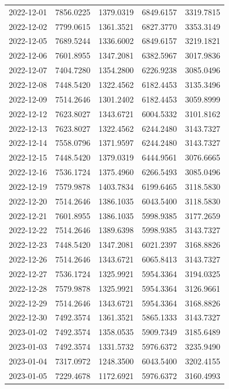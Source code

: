 {\begin{longtable}{lllll}
2022-12-01 & 7856.0225 & 1379.0319 & 6849.6157 & 3319.7815 \\
2022-12-02 & 7799.0615 & 1361.3521 & 6827.3770 & 3353.3149 \\
2022-12-05 & 7689.5244 & 1336.6002 & 6849.6157 & 3219.1821 \\
2022-12-06 & 7601.8955 & 1347.2081 & 6382.5967 & 3017.9836 \\
2022-12-07 & 7404.7280 & 1354.2800 & 6226.9238 & 3085.0496 \\
2022-12-08 & 7448.5420 & 1322.4562 & 6182.4453 & 3135.3496 \\
2022-12-09 & 7514.2646 & 1301.2402 & 6182.4453 & 3059.8999 \\
2022-12-12 & 7623.8027 & 1343.6721 & 6004.5332 & 3101.8162 \\
2022-12-13 & 7623.8027 & 1322.4562 & 6244.2480 & 3143.7327 \\
2022-12-14 & 7558.0796 & 1371.9597 & 6244.2480 & 3143.7327 \\
2022-12-15 & 7448.5420 & 1379.0319 & 6444.9561 & 3076.6665 \\
2022-12-16 & 7536.1724 & 1375.4960 & 6266.5493 & 3085.0496 \\
2022-12-19 & 7579.9878 & 1403.7834 & 6199.6465 & 3118.5830 \\
2022-12-20 & 7514.2646 & 1386.1035 & 6043.5400 & 3118.5830 \\
2022-12-21 & 7601.8955 & 1386.1035 & 5998.9385 & 3177.2659 \\
2022-12-22 & 7514.2646 & 1389.6398 & 5998.9385 & 3143.7327 \\
2022-12-23 & 7448.5420 & 1347.2081 & 6021.2397 & 3168.8826 \\
2022-12-26 & 7514.2646 & 1343.6721 & 6065.8413 & 3143.7327 \\
2022-12-27 & 7536.1724 & 1325.9921 & 5954.3364 & 3194.0325 \\
2022-12-28 & 7579.9878 & 1325.9921 & 5954.3364 & 3126.9661 \\
2022-12-29 & 7514.2646 & 1343.6721 & 5954.3364 & 3168.8826 \\
2022-12-30 & 7492.3574 & 1361.3521 & 5865.1333 & 3143.7327 \\
2023-01-02 & 7492.3574 & 1358.0535 & 5909.7349 & 3185.6489 \\
2023-01-03 & 7492.3574 & 1331.5732 & 5976.6372 & 3235.9490 \\
2023-01-04 & 7317.0972 & 1248.3500 & 6043.5400 & 3202.4155 \\
2023-01-05 & 7229.4678 & 1172.6921 & 5976.6372 & 3160.4993 \\

\end{longtable}}
